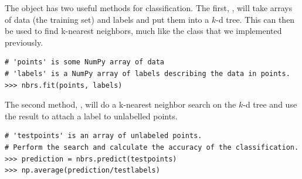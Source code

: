 The  object has two useful methods for classification.
The first, , will take arrays of data (the training set) and labels and put them into a $k$-d tree.
This can then be used to find k-nearest neighbors, much like the  class that we implemented previously.

\begin{lstlisting}
# 'points' is some NumPy array of data
# 'labels' is a NumPy array of labels describing the data in points.
>>> nbrs.fit(points, labels)
\end{lstlisting}

The second method, , will do a k-nearest neighbor search on the $k$-d tree and use the result to attach a label to unlabelled points.

\begin{lstlisting}
# 'testpoints' is an array of unlabeled points.
# Perform the search and calculate the accuracy of the classification.
>>> prediction = nbrs.predict(testpoints)
>>> np.average(prediction/testlabels)
\end{lstlisting}

